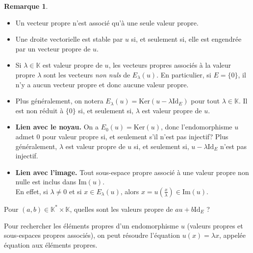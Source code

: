 \documentclass[french]{article}
\newcommand{\K}{\mathbb{K}}
\newcommand{\st}{^*}
\renewcommand{\ker}{\text{Ker}}
\newcommand{\Id}{\text{Id}}
\theoremstyle{plain}
\theoremstyle{definition}
\newtheorem*{rmq}{Remarque}
\theoremstyle{remark}
\begin{document}
	\begin{rmq}
		\begin{itemize}
			\item Un vecteur propre n'est associé qu'à une seule valeur propre.
			\item Une droite vectorielle est stable par $u$ si, et seulement si, elle est engendrée par un vecteur propre de $u$. %
			\item Si $\lambda\in\K$ est valeur propre de $u$, les vecteurs propres associés à la valeur propre $\lambda$ sont les vecteurs \textit{non nuls} de $E_\lambda(u)$. En particulier, si $E=\{0\}$, il n'y a aucun vecteur propre et donc aucune valeur propre.
			\item Plus généralement, on notera $E_\lambda(u)=\ker(u-\lambda\Id_E)$ pour tout $\lambda\in\K$. Il est non réduit à $\{0\}$ si, et seulement si, $\lambda$ est valeur propre de $u$.
			\item \textbf{Lien avec le noyau.} On a $E_0(u)=\ker(u)$, donc l'endomorphisme $u$ admet $0$ pour valeur propre si, et seulement s'il n'est pas injectif? Plus généralement, $\lambda$ est valeur propre de $u$ si, et seulement si, $u-\lambda\Id_E$ n'est pas injectif.
			\item \textbf{Lien avec l'image.} Tout sous-espace propre associé à une valeur propre non nulle est inclus dans $\text{Im}(u)$.\\ En effet, si $\lambda\ne 0$ et si $x\in E_\lambda(u)$, alors $x=\displaystyle u\left(\frac{x}{\lambda}\right)\in\text{Im}(u)$.
		\end{itemize}
	\end{rmq}
	
	\begin{exo}
		Pour $(a,b)\in\K\st\times\K$, quelles sont les valeurs propre de $au+b\Id_E$ ?
	\end{exo}
	
	\begin{met}
		Pour rechercher les éléments propres d'un endomorphisme $u$ (valeurs propres et sous-espaces propres associés), on peut résoudre l'équation $u(x)=\lambda x$, appelée équation aux éléments propres.
	\end{met}
	
\end{document}
